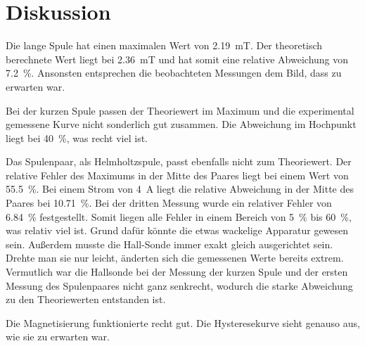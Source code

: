 \section{Diskussion}
\label{sec:Diskussion}

Die lange Spule hat einen maximalen Wert von \SI{2.19}{\milli\tesla}. Der theoretisch berechnete Wert liegt bei %
\SI{2.36}{\milli\tesla} und hat somit eine relative Abweichung von \SI{7.2}{\percent}. Ansonsten entsprechen die 
beobachteten Messungen dem Bild, dass zu erwarten war.

\noindent Bei der kurzen Spule passen der Theoriewert im Maximum und die experimental gemessene Kurve nicht sonderlich gut zusammen. Die Abweichung im 
Hochpunkt liegt bei \SI{40}{\percent}, was recht viel ist. 

\noindent Das Spulenpaar, als Helmholtzspule, passt ebenfalls nicht zum Theoriewert. Der relative Fehler des Maximums in der Mitte 
des Paares liegt bei einem Wert von \SI{55.5}{\percent}. %
Bei einem Strom von \SI{4}{\ampere} liegt die relative Abweichung in der Mitte des Paares bei \SI{10.71}{\percent}. %
Bei der dritten Messung wurde ein %
relativer Fehler von \SI{6.84}{\percent} festgestellt. Somit liegen alle Fehler in einem Bereich von \SI{5}{\percent} 
bis \SI{60}{\percent}, was relativ viel ist. Grund dafür könnte die etwas wackelige Apparatur gewesen sein. %
Außerdem musste die Hall-Sonde immer exakt gleich ausgerichtet sein. Drehte man sie nur leicht, änderten sich die %
gemessenen Werte bereits extrem.
\newline
Vermutlich war die Hallsonde bei der Messung der kurzen Spule und der ersten Messung %
des Spulenpaares nicht ganz senkrecht, wodurch die starke Abweichung zu den Theoriewerten entstanden ist. 

\noindent Die Magnetisierung funktionierte recht gut. Die Hysteresekurve sieht genauso aus, wie sie zu erwarten war. %

